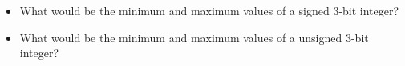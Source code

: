 \begin{itemize}
  \item What would be the minimum and maximum values of a signed 3-bit integer?
    \vfill

  \item What would be the minimum and maximum values of a unsigned 3-bit
    integer?
    \vfill

\end{itemize}

\newpage

